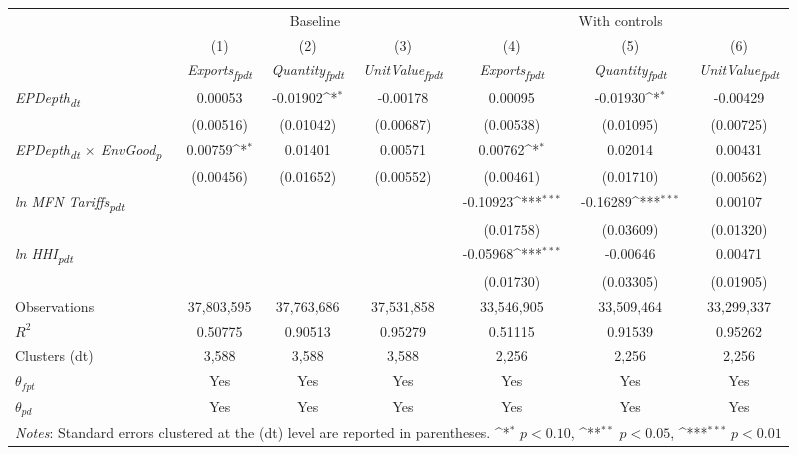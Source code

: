 {
\def\sym#1{\ifmmode^{#1}\else\(^{#1}\)\fi}
\begin{tabular}{l*{6}{c}}
\toprule
&\multicolumn{3}{c}{Baseline}&\multicolumn{3}{c}{With controls}\\\cmidrule(lr){2-4}\cmidrule(lr){5-7}
&(1)&(2)&(3)&(4)&(5)&(6)\\
&\textit{Exports\textsubscript{fpdt}}&\textit{Quantity\textsubscript{fpdt}}&\textit{UnitValue\textsubscript{fpdt}}&\textit{Exports\textsubscript{fpdt}}&\textit{Quantity\textsubscript{fpdt}}&\textit{UnitValue\textsubscript{fpdt}}\\
\midrule
\textit{EPDepth\textsubscript{dt}} & 0.00053 & -0.01902\sym{*} & -0.00178 & 0.00095 & -0.01930\sym{*} & -0.00429\\
 & (0.00516) & (0.01042) & (0.00687) & (0.00538) & (0.01095) & (0.00725)\\
\addlinespace
\textit{EPDepth\textsubscript{dt} $\times$ EnvGood\textsubscript{p}} & 0.00759\sym{*} & 0.01401 & 0.00571 & 0.00762\sym{*} & 0.02014 & 0.00431\\
 & (0.00456) & (0.01652) & (0.00552) & (0.00461) & (0.01710) & (0.00562)\\
\addlinespace
\textit{ln MFN Tariffs\textsubscript{pdt}} &  &  &  & -0.10923\sym{***} & -0.16289\sym{***} & 0.00107\\
 &  &  &  & (0.01758) & (0.03609) & (0.01320)\\
\addlinespace
\textit{ln HHI\textsubscript{pdt}} &  &  &  & -0.05968\sym{***} & -0.00646 & 0.00471\\
 &  &  &  & (0.01730) & (0.03305) & (0.01905)\\
\midrule
Observations & 37,803,595 & 37,763,686 & 37,531,858 & 33,546,905 & 33,509,464 & 33,299,337\\
$R^{2}$ & 0.50775 & 0.90513 & 0.95279 & 0.51115 & 0.91539 & 0.95262\\
Clusters (dt) & 3,588 & 3,588 & 3,588 & 2,256 & 2,256 & 2,256\\
$\theta_{fpt}$ & Yes & Yes & Yes & Yes & Yes & Yes\\
$\theta_{pd}$ & Yes & Yes & Yes & Yes & Yes & Yes\\
\bottomrule
\multicolumn{7}{l}{\footnotesize \textit{Notes}: Standard errors clustered at the (dt) level are reported in parentheses. \sym{*} \(p<0.10\), \sym{**} \(p<0.05\), \sym{***} \(p<0.01\)}\\
\end{tabular}
}

